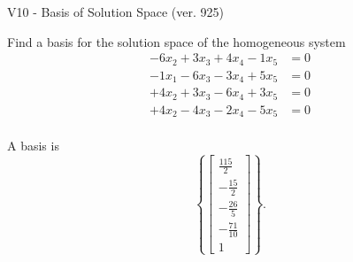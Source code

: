 \begin{exercise}
  \begin{exerciseTitle}V10 - Basis of Solution Space (ver. 925)\end{exerciseTitle}
  \begin{exerciseStatement}
    Find a basis for the solution space of the homogeneous system 
\begin{align*}
 -6 x_ 2 + 3 x_ 3 + 4 x_ 4 -1 x_ 5 &= 0  \\ 
  -1 x_ 1 -6 x_ 3 -3 x_ 4 + 5 x_ 5 &= 0  \\ 
  + 4 x_ 2 + 3 x_ 3 -6 x_ 4 + 3 x_ 5 &= 0  \\ 
  + 4 x_ 2 -4 x_ 3 -2 x_ 4 -5 x_ 5 &= 0  \\ 
 \end{align*}


 
  \end{exerciseStatement}

  \begin{exerciseAnswer}
   A basis is   
\[\left\{\left[\begin{array}{c}
\frac{115}{2} \\
-\frac{15}{2} \\
-\frac{26}{5} \\
-\frac{71}{10} \\
1
\end{array}\right]\right\}.\]

  


  \end{exerciseAnswer}
\end{exercise}